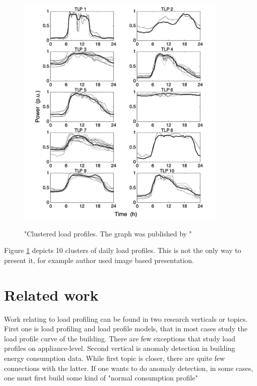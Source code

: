 \documentclass[
11pt, %
english, %
singlespacing, %
headsepline, %
]{MastersDoctoralThesis} %
\begin{document}
\begin{figure}[H]
	\centering
	\caption{"Clustered load profiles. The graph was published by \protect\cite{GERBEC2005}"}
	\includegraphics[width=0.9\textwidth]{Figures/clustered_profiles.png}
	\label{fig:profiles}
\end{figure}

Figure \ref{fig:profiles} depicts 10 clusters of daily load profiles. 
This is not the only way to present it, for example author \cite{Park2019} used image based presentation.


\section{Related work}

Work relating to load profiling can be found in two research verticals or topics. First one is load profiling and load profile models, that in 
most cases study the load profile curve of the building. There are few exceptions that study load profiles on appliance-level.
Second vertical is anomaly detection in building energy consumption data. While first topic is closer, there are quite few connections with the latter. 
If one wants to do anomaly detection, in some cases, one must first build some kind of "normal consumption profile" 
\end{document}

